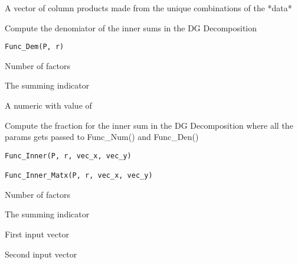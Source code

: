 \documentclass[a4paper]{book}
\begin{document}
%
\begin{Value}
A vector of column products made from the unique combinations
of the *data*
\end{Value}
%
\begin{Description}\relax
Compute the denomiator of the inner sums in the DG Decomposition
\end{Description}
%
\begin{Usage}
\begin{verbatim}
Func_Dem(P, r)
\end{verbatim}
\end{Usage}
%
\begin{Arguments}
\begin{ldescription}
\item[\code{P}] Number of factors

\item[\code{r}] The summing indicator
\end{ldescription}
\end{Arguments}
%
\begin{Value}
A numeric with value of 
\end{Value}
%
\begin{Description}\relax
Compute the fraction for the inner sum in the DG Decomposition
where all the params gets passed to Func\_Num() and Func\_Den()
\end{Description}
%
\begin{Usage}
\begin{verbatim}
Func_Inner(P, r, vec_x, vec_y)

Func_Inner_Matx(P, r, vec_x, vec_y)
\end{verbatim}
\end{Usage}
%
\begin{Arguments}
\begin{ldescription}
\item[\code{P}] Number of factors

\item[\code{r}] The summing indicator

\item[\code{vec\_x}] First input vector

\item[\code{vec\_y}] Second input vector
\end{ldescription}
\end{Arguments}
\end{document}
